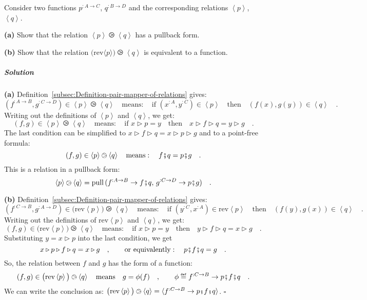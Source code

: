 Consider two functions $p^{:A\rightarrow C}$, $q^{:B\rightarrow D}$
and the corresponding relations $\left<p\right>$, $\left<q\right>$.

\textbf{(a)} Show that the relation $\left<p\right>\ogreaterthan\left<q\right>$
has a pullback form.

\textbf{(b)} Show that the relation $\big(\text{rev}\langle p\rangle\big)\ogreaterthan\left<q\right>$
is equivalent to a function.

\subparagraph{Solution}

\textbf{(a)} Definition~\ref{subsec:Definition-pair-mapper-of-relations}
gives:
\[
(f^{:A\rightarrow B},g^{:C\rightarrow D})\in\left<p\right>\ogreaterthan\left<q\right>\quad\text{means}:\quad\text{if }(x^{:A},y^{:C})\in\left<p\right>\quad\text{then}\quad(f(x),g(y))\in\left<q\right>\quad.
\]
Writing out the definitions of $\left<p\right>$ and $\left<q\right>$,
we get:
\[
(f,g)\in\left<p\right>\ogreaterthan\left<q\right>\quad\text{means}:\quad\text{if }x\triangleright p=y\quad\text{then}\quad x\triangleright f\triangleright q=y\triangleright g\quad.
\]
The last condition can be simplified to $x\triangleright f\triangleright q=x\triangleright p\triangleright g$
and to a point-free formula:
\[
(f,g)\in\left<p\right>\ogreaterthan\left<q\right>\quad\text{means}:\quad f\bef q=p\bef g\quad.
\]
This is a relation in a pullback form:
\[
\left<p\right>\ogreaterthan\left<q\right>=\text{pull}\,(f^{:A\rightarrow B}\rightarrow f\bef q,\,g^{:C\rightarrow D}\rightarrow p\bef g)\quad.
\]

\textbf{(b)} Definition~\ref{subsec:Definition-pair-mapper-of-relations}
gives:
\[
(f^{:C\rightarrow B},g^{:A\rightarrow D})\in\big(\text{rev}\left<p\right>\big)\ogreaterthan\left<q\right>\quad\text{means}:\quad\text{if }(y^{:C},x^{:A})\in\text{rev}\left<p\right>\quad\text{then}\quad(f(y),g(x))\in\left<q\right>\quad.
\]
Writing out the definitions of $\text{rev}\left<p\right>$ and $\left<q\right>$,
we get:
\[
(f,g)\in\big(\text{rev}\left<p\right>\big)\ogreaterthan\left<q\right>\quad\text{means}:\quad\text{if }x\triangleright p=y\quad\text{then}\quad y\triangleright f\triangleright q=x\triangleright g\quad.
\]
Substituting $y=x\triangleright p$ into the last condition, we get
\[
x\triangleright p\triangleright f\triangleright q=x\triangleright g\quad,\quad\quad\text{or equivalently}:\quad p\bef f\bef q=g\quad.
\]
So, the relation between $f$ and $g$ has the form of a function:
\[
(f,g)\in\big(\text{rev}\left<p\right>\big)\ogreaterthan\left<q\right>\quad\text{means}\quad g=\phi(f)\quad,\quad\quad\phi\triangleq f^{:C\rightarrow B}\rightarrow p\bef f\bef q\quad.
\]
We can write the conclusion as: $\big(\text{rev}\left<p\right>\big)\ogreaterthan\left<q\right>=\langle f^{:C\rightarrow B}\rightarrow p\bef f\bef q\rangle$.
$\square$

